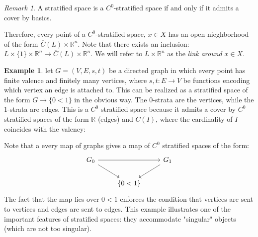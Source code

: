 \documentclass[11pt,reqno]{amsart}
\theoremstyle{plain}
\numberwithin{equation}{section}
\theoremstyle{remark}
\newtheorem{rek}[thm]{Remark}
\theoremstyle{definition}
\newtheorem{ex}[thm]{Example}
\newcommand{\R}{\mathbb{R}}
\begin{document}
\begin{rek}
A stratified space is a $C^0$-stratified space if and only if it admits a cover by basics.

 Therefore, every point of a $C^0$-stratified space, $x \in X$ has an open nieghborhood of the form $\overline{C}(L)\times \R^n$. Note that there exists an inclusion: $ L \times \{1\}\times \R^n \rightarrow  \overline{C}(L)\times \R^n$. We will refer to $L\times \R^n$ as the \textit{ link around }$x\in X$.
\end{rek} 

\begin{ex}
let $G = (V, E, s, t)$ be a directed graph in which every point has finite valence and finitely many vertices, where $s, t: E \rightarrow V$ be functions encoding which vertex an edge is attached to. This can be realized as a stratified space of the form $G \rightarrow \{0 < 1 \} $ in the obvious way. The 0-strata are the vertices, while the 1-strata are edges. This is a $C^0$ stratified space because it admits a cover by $C^0$ stratified spaces of the form $\R$ (edges) and $C(I)$, where the cardinality of $I$ coincides with the valency:

Note that a every map of graphs gives a map of $C^0$ stratified spaces of the form: 
$$
\begin{tikzcd}
G_0 \arrow[rd] \arrow[rr] &           & G_1 \arrow[ld] \\
                          & \{0 < 1\} &               
\end{tikzcd}
$$
The fact that the map lies over ${0 < 1}$ enforces the condition that vertices are sent to vertices and edges are sent to edges. 
This example illustrates one of the important features of stratified spaces: they accommodate "singular" objects (which are not too singular). 
\end{ex}
\end{document}
